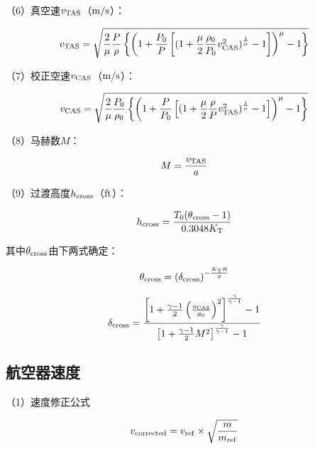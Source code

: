 \documentclass[a4paper,punct,space,heading=true,AutoFakeBold]{ctexrep}
\begin{document}
（6）真空速$v_{\rm TAS}$（$\rm m/s$）：

\begin{equation}\label{TAS}
v_{\rm TAS}=\sqrt{\frac{2}{\mu} \frac{P}{\rho} \left\{\left(1+\frac{P_{\rm 0}}{P}\left[(1+\frac{\mu}{2}\frac{\rho_{\rm 0}}{P_{\rm 0}}v_{\rm CAS}^2)^{\frac{1}{\mu}}-1\right]\right)^\mu -1\right\}}
\end{equation}

（7）校正空速$v_{\rm CAS}$（$\rm m/s$）：

\begin{equation}\label{CAS}
v_{\rm CAS}=\sqrt{\frac{2}{\mu} \frac{P_{\rm 0}}{\rho_{\rm 0}} \left\{\left(1+\frac{P}{P_{\rm 0}}\left[(1+\frac{\mu}{2}\frac{\rho}{P}v_{\rm TAS}^2)^{\frac{1}{\mu}}-1\right]\right)^\mu -1\right\}}
\end{equation}

（8）马赫数$M$：

\begin{equation}
M=\frac{v_{\rm TAS}}{a}
\end{equation}

（9）过渡高度$h_{\rm cross}$（$\rm ft$）：

\begin{equation}\label{hCross}
h_{\rm cross}=\frac{T_{\rm 0}(\theta_{\rm cross}-1)}{0.3048 K_{\rm T}}
\end{equation}

其中$\theta_{\rm cross}$由下两式确定：

\begin{equation}
\theta_{\rm cross}=\left(\delta_{\rm cross}\right)^{-\frac{K_{\rm T}R}{g}}
\end{equation}

\begin{equation}
\delta_{\rm cross}=\frac{\left[1+\frac{\gamma -1}{2} \left(\frac{v_{\rm CAS}}{a_{\rm 0}}\right)^2\right]^{\frac{\gamma}{\gamma -1}}-1}{\left[1+\frac{\gamma -1}{2} M^2\right]^{\frac{\gamma}{\gamma -1}}-1}
\end{equation}


\subsection{航空器速度}

（1）速度修正公式

\begin{equation}\label{VCorrection}
v_{\rm corrected}=v_{\rm ref}\times \sqrt{\frac{m}{m_{\rm ref}}}
\end{equation}
\end{document}
